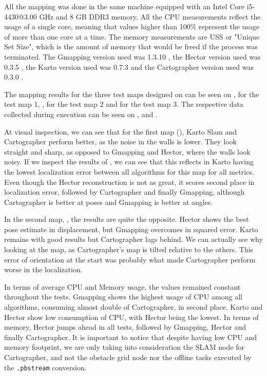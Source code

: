All the mapping was done in the same machine equipped with an Intel Core i5-4430@3.00 GHz and 8 GB DDR3 memory. All the CPU measurements reflect the usage of a single core, meaning that values higher than 100\% represent the usage of more than one core at a time. The memory measurements are USS or "Unique Set Size", which is the amount of memory that would be freed if the process was terminated. The Gmapping version used was 1.3.10 \cite{gmappinggit}, the Hector version used was 0.3.5 \cite{hectorgit}, the Karto version used was 0.7.3 \cite{kartogit} and the Cartographer version used was 0.3.0 \cite{cartographergit}.

The mapping results for the three test maps designed on  can be seen on , for the test map 1, , for the test map 2 and  for the test map 3. The respective data collected during execution can be seen on ,  and .

At visual inspection, we can see that for the first map (), Karto Slam and Cartographer perform better, as the noise in the walls is lower. They look straight and sharp, as opposed to Gmapping and Hector, where the walls look noisy. If we inspect the results of , we can see that this reflects in Karto having the lowest localization error between all algorithms for this map for all metrics. Even though the Hector reconstruction is not as great, it scores second place in localization error, followed by Cartographer and finally Gmapping, although Cartographer is better at poses and Gmapping is better at angles.

In the second map, , the results are quite the opposite. Hector shows the best pose estimate in displacement, but Gmapping overcomes in squared error. Karto remains with good results but Cartographer lags behind. We can actually see why looking at the map, as Cartographer's map is tilted relative to the others. This error of orientation at the start was probably what made Cartographer perform worse in the localization.

In terms of average CPU and Memory usage, the values remained constant throughout the tests. Gmapping shows the highest usage of CPU among all algorithms, consuming almost double of Cartographer, in second place. Karto and Hector show low consumption of CPU, with Hector being the lowest. In terms of memory, Hector jumps ahead in all tests, followed by Gmapping, Hector and finally Cartographer. It is important to notice that despite having low CPU and memory footprint, we are only taking into consideration the SLAM node for Cartographer, and not the obstacle grid node nor the offline tasks executed by the \texttt{.pbstream} conversion.

